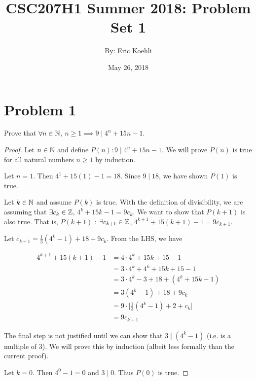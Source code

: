 \documentclass[12pt, a4paper]{amsart}
\theoremstyle{definition}
\theoremstyle{remark}
\numberwithin{Theorem}{section}
\begin{document}
\title{CSC207H1 Summer 2018: Problem Set 1}
\author{By: Eric Koehli}
\date{May 26, 2018}
\maketitle
\newpage

\section{Problem 1}

Prove that
$\forall n \in \mathbb N$, $n \geqslant 1 \implies 9 \mid 4^n  + 15n - 1$.
    
\begin{proof}
    
Let $n \in \mathbb N$ and define $P(n) : 9 \mid 4^n  + 15n - 1$. 
We will prove $P(n)$ is true for all natural numbers $n \geqslant 1$
by induction.

\base

Let $n = 1$. Then $4^1 + 15(1) - 1 = 18$. Since $9 \mid 18$,
we have shown $P(1)$ is true.

\istep

Let $k \in \mathbb N$ and assume $P(k)$ is true. With the definition of
divisibility, we are assuming that
$\exists c_k \in \mathbb Z$, $4^k + 15k - 1 = 9c_k$. We want to show that
$P(k + 1)$ is also true. That is,
$P(k + 1)$ : $\exists c_{k+1} \in \mathbb Z$, 
$4^{k+1} + 15(k + 1) - 1 = 9c_{k+1}$.

Let $c_{k + 1} = \frac{1}{3}(4^k - 1) + 18 + 9c_k$. From the LHS, we have

\begin{align*}
    4^{k+1} + 15(k + 1) - 1 &= 4 \cdot 4^k + 15k + 15 - 1 \\
    &= 3 \cdot 4^k + 4^k + 15k + 15 - 1 \\
    &= 3 \cdot 4^k - 3 + 18 + (4^k + 15k - 1) \\
    &= 3(4^k - 1) + 18 + 9c_k \tag{By I.H.} \\
    &= 9 \cdot \big[ \frac{1}{3}(4^k - 1) + 2 + c_k \big ] \\
    &= 9c_{k+1}
\end{align*}

The final step is not justified until we can show that
$3 \mid (4^k - 1)$ (i.e. is a multiple of 3). We will prove this by
induction (albeit less formally than the current proof).

\base 

Let $k = 0$. Then $4^0 - 1 = 0$ and $3 \mid 0$. Thus $P(0)$ is true.


\end{proof}
\end{document}
